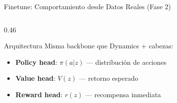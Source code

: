\documentclass[aspectratio=169, 12pt]{beamer}
\begin{document}
\begin{frame}{Finetune: Comportamiento desde Datos Reales (Fase 2)}
\begin{columns}[T]
\begin{column}{0.46\textwidth}
    \vspace{8pt}
    \begin{block}{Arquitectura}
      Misma backbone que Dynamics + cabezas:
      \begin{itemize}\small
        \item \textbf{Policy head}: $\pi(a|z)$ — distribución de acciones
        \item \textbf{Value head}: $V(z)$ — retorno esperado
        \item \textbf{Reward head}: $r(z)$ — recompensa inmediata
      \end{itemize}
    \end{block}
  \end{column}
\end{columns}
\end{frame}
\end{document}
